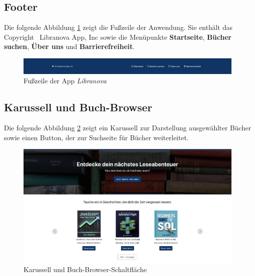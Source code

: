 \subsection{Footer}
Die folgende Abbildung \ref{fig:footer} zeigt die Fußzeile der Anwendung. Sie enthält das Copyright \textcopyright\ Libranova App, Inc sowie die Menüpunkte \textbf{Startseite}, \textbf{Bücher suchen}, \textbf{Über uns} und \textbf{Barrierefreiheit}.

\begin{figure}[H]
	\centering
	\includegraphics[width=1.0\textwidth]{images/UI-screenshots/Footer.png}%
	\caption{ Fußzeile der App \textit{Libranova}}
	\label{fig:footer}%
\end{figure}

\subsection{Karussell und Buch-Browser}

Die folgende Abbildung  \ref{fig:Carousel_and_BookBrowser} zeigt ein Karussell zur Darstellung ausgewählter Bücher sowie einen Button, der zur Suchseite für Bücher weiterleitet.

\begin{figure}[H]
	\centering
	\includegraphics[width=1.0\textwidth]{images/UI-screenshots/Carousel_and_BookBrowser.png}%
	\caption{Karussell und Buch-Browser-Schaltfläche}
	\label{fig:Carousel_and_BookBrowser}%
\end{figure}

